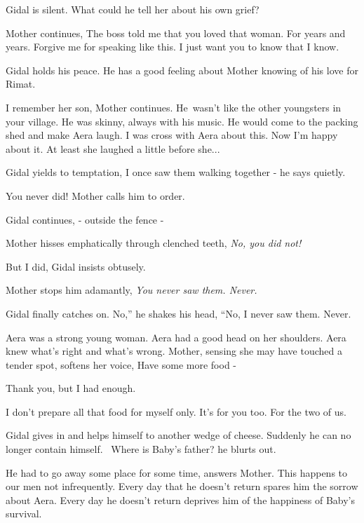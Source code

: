 \documentclass[12pt]{book}
\begin{document}
Gidal is silent. What could he tell her about his own grief? ~

Mother continues, {\textquotedbl}The boss told me that you loved that woman. For years and years. Forgive me for
speaking like this. I just want you to know that I know.{\textquotedbl}

Gidal holds his peace. He has a good feeling about Mother knowing of his love for Rimat.

{\textquotedbl}I remember her son,{\textquotedbl} Mother continues. {\textquotedbl}He~wasn't like the other youngsters
in your village. He was skinny, always with his{ music}. He would come to the
packing shed and make Aera laugh. I was cross with Aera about this. Now I'm happy about it. At least she laughed a
little before she... {\textquotedbl}

Gidal yields to temptation, {\textquotedbl}I once saw them walking together -{\textquotedbl} he says quietly.

{\textquotedbl}You never did!{\textquotedbl} Mother calls him to order.

Gidal continues, {\textquotedbl}- outside the fence -{\textquotedbl}

Mother hisses emphatically through clenched teeth, {\textquotedbl}\textit{No, you did not!}{\textquotedbl}

{\textquotedbl}But I did,{\textquotedbl} Gidal insists obtusely.

Mother stops him adamantly, {\textquotedbl}\textit{You never saw them. Never.}{\textquotedbl}

Gidal finally catches on. {\textquotedbl}No,'' he shakes his head, ``No, I never saw them. Never.{\textquotedbl}

{\textquotedbl}Aera was a strong young woman. Aera had a good head on her shoulders. Aera knew what's right and what's
wrong.{\textquotedbl} Mother, sensing she may have touched a tender spot, softens her voice, {\textquotedbl}Have some
more food -{\textquotedbl}

{\textquotedbl}Thank you, but I had enough.{\textquotedbl}

{\textquotedbl}I don't prepare all that food for myself only. It's for you too. For the two of us.{\textquotedbl}

Gidal gives in and helps himself to another wedge of cheese. Suddenly he can no longer contain himself.
\ {\textquotedbl}Where is Baby's father?{\textquotedbl} he blurts out.

{\textquotedbl}He had to go away some place for some time,{\textquotedbl} answers Mother. {\textquotedbl}This happens to
our men not infrequently. Every day that he doesn't return spares him the sorrow about Aera. Every day he doesn't
return deprives him of the happiness of Baby's survival. {\textquotedbl}
\end{document}
